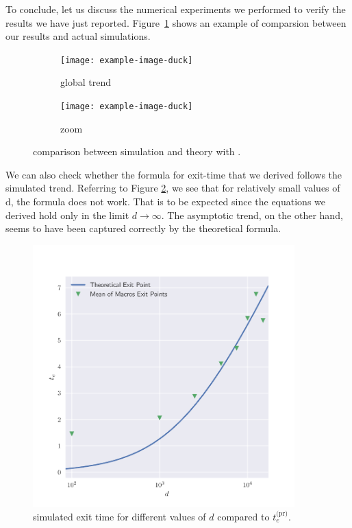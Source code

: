 To conclude, let us discuss the numerical experiments we performed to verify the results we have just reported.
Figure~\ref{fig:spherical-phase-retrivial-d10000} shows an example of comparsion between our results and actual simulations.
\begin{figure}
  \centering
  \begin{subfigure}{0.495\textwidth}
    \texttt{[image: example-image-duck]}
    \caption{global trend}
  \end{subfigure}
  \begin{subfigure}{0.495\textwidth}
    \texttt{[image: example-image-duck]}
    \caption{zoom}
  \end{subfigure}

  \caption{
    comparison between simulation and theory with \(\).
  }
  \label{fig:spherical-phase-retrivial-d10000}
\end{figure}
We can also check whether the formula for exit-time that we derived follows the simulated trend.
Referring to Figure \ref{fig:spherical-phase-retrivial-with-d}, we see that for relatively small values of d, the formula does not work.
That is to be expected since the equations we derived hold only in the limit \(d\to\infty\).
The asymptotic trend, on the other hand, seems to have been captured correctly by the theoretical formula.
\begin{figure}
  \centering
  \includegraphics[width=0.9\textwidth]{figures/spherical/phase-retrivial-dplot.pdf}
  \caption{
    simulated exit time for different values of \(d\) compared to \(t^\text{(pr)}_e\).
  }
  \label{fig:spherical-phase-retrivial-with-d}
\end{figure}

